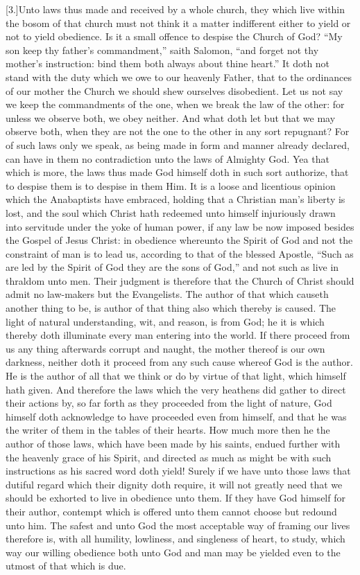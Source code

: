 [3.]Unto laws thus made and received by a whole church, they which live within the bosom of that church must not think it a matter indifferent either to yield or not to yield obedience. Is it a small offence to despise the Church of God? “My son keep thy father’s commandment,” saith Salomon, “and forget not thy mother’s instruction: bind them both always about thine heart.” It doth not stand with the duty which we owe to our heavenly Father, that to the ordinances of our mother the Church we should shew ourselves disobedient. Let us not say we keep the commandments of the one, when we break the law of the other: for  unless we observe both, we obey neither. And what doth let but that we may observe both, when they are not the one to the other in any sort repugnant? For of such laws only we speak, as being made in form and manner already declared, can have in them no contradiction unto the laws of Almighty God. Yea that which is more, the laws thus made God himself doth in such sort authorize, that to despise them is to despise in them Him. It is a loose and licentious opinion which the Anabaptists have embraced, holding that a Christian man’s liberty is lost, and the soul which Christ hath redeemed unto himself injuriously drawn into servitude under the yoke of human power, if any law be now imposed besides the Gospel of Jesus Christ: in obedience whereunto the Spirit of God and not the constraint of man is to lead us, according to that of the blessed Apostle, “Such as are led by the Spirit of God they are the sons of God,” and not such as live in thraldom unto men. Their judgment is therefore that the Church of Christ should admit no law-makers but the Evangelists. The author of that which causeth another thing to be, is author of that thing also which thereby is caused. The light of natural understanding, wit, and reason, is from God; he it is which thereby doth illuminate every man entering into the world. If there proceed from us any thing afterwards corrupt and naught, the mother thereof is our own darkness, neither doth it proceed from any such cause whereof God is the author. He is the author of all that we think or do by virtue of that light, which himself hath given. And therefore the laws which the very heathens did gather to direct their actions by, so far forth as they proceeded from the light of nature, God himself doth acknowledge to have proceeded even from himself, and that he was the writer of them in the tables of their hearts. How much more then he the author of those laws, which have been made by his saints, endued further with the heavenly grace of his Spirit, and directed as much as might be with such instructions as his sacred word doth yield! Surely if we have unto those laws that dutiful regard which their dignity doth require, it will not greatly need that we should be exhorted to live in obedience unto them. If they have God himself for their  author, contempt which is offered unto them cannot choose but redound unto him. The safest and unto God the most acceptable way of framing our lives therefore is, with all humility, lowliness, and singleness of heart, to study, which way our willing obedience both unto God and man may be yielded even to the utmost of that which is due.

